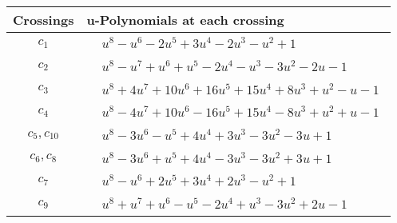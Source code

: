 \documentclass[1p]{elsarticle_modified}
\theoremstyle{definition}
\begin{document}
\begin{tabular}{m{50pt}|m{274pt}}
Crossings & \hspace{64pt}u-Polynomials at each crossing \\
\hline $$\begin{aligned}c_{1}\end{aligned}$$&$\begin{aligned}
&u^8- u^6-2 u^5+3 u^4-2 u^3- u^2+1
\end{aligned}$\\
\hline $$\begin{aligned}c_{2}\end{aligned}$$&$\begin{aligned}
&u^8- u^7+u^6+u^5-2 u^4- u^3-3 u^2-2 u-1
\end{aligned}$\\
\hline $$\begin{aligned}c_{3}\end{aligned}$$&$\begin{aligned}
&u^8+4 u^7+10 u^6+16 u^5+15 u^4+8 u^3+u^2- u-1
\end{aligned}$\\
\hline $$\begin{aligned}c_{4}\end{aligned}$$&$\begin{aligned}
&u^8-4 u^7+10 u^6-16 u^5+15 u^4-8 u^3+u^2+u-1
\end{aligned}$\\
\hline $$\begin{aligned}c_{5},c_{10}\end{aligned}$$&$\begin{aligned}
&u^8-3 u^6- u^5+4 u^4+3 u^3-3 u^2-3 u+1
\end{aligned}$\\
\hline $$\begin{aligned}c_{6},c_{8}\end{aligned}$$&$\begin{aligned}
&u^8-3 u^6+u^5+4 u^4-3 u^3-3 u^2+3 u+1
\end{aligned}$\\
\hline $$\begin{aligned}c_{7}\end{aligned}$$&$\begin{aligned}
&u^8- u^6+2 u^5+3 u^4+2 u^3- u^2+1
\end{aligned}$\\
\hline $$\begin{aligned}c_{9}\end{aligned}$$&$\begin{aligned}
&u^8+u^7+u^6- u^5-2 u^4+u^3-3 u^2+2 u-1
\end{aligned}$\\
\hline
\end{tabular}\\~\\
\end{document}
